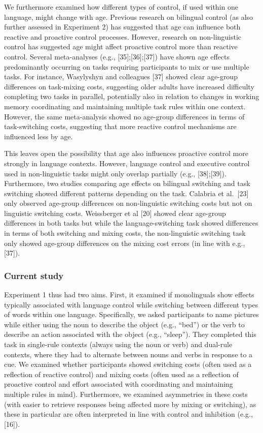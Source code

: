 \documentclass[
]{article}
\begin{document}
We furthermore examined how different types of control, if used within one language, might change with age. Previous research on bilingual control (as also further assessed in Experiment 2) has suggested that age can influence both reactive and proactive control processes. However, research on non-linguistic control has suggested age might affect proactive control more than reactive control. Several meta-analyses (e.g., {[}35{]};{[}36{]};{[}37{]}) have shown age effects predominantly occurring on tasks requiring participants to mix or use multiple tasks. For instance, Wasylyshyn and colleagues {[}37{]} showed clear age-group differences on task-mixing costs, suggesting older adults have increased difficulty completing two tasks in parallel, potentially also in relation to changes in working memory coordinating and maintaining multiple task rules within one context. However, the same meta-analysis showed no age-group differences in terms of task-switching costs, suggesting that more reactive control mechanisms are influenced less by age.

This leaves open the possibility that age also influences proactive control more strongly in language contexts. However, language control and executive control used in non-linguistic tasks might only overlap partially (e.g., {[}38{]};{[}39{]}). Furthermore, two studies comparing age effects on bilingual switching and task switching showed different patterns depending on the task. Calabria et al.~{[}23{]} only observed age-group differences on non-linguistic switching costs but not on linguistic switching costs. Weissberger et al {[}20{]} showed clear age-group differences in both tasks but while the language-switching task showed differences in terms of both switching and mixing costs, the non-linguistic switching task only showed age-group differences on the mixing cost errors (in line with e.g., {[}37{]}).

\hypertarget{current-study}{%
\subsubsection{Current study}\label{current-study}}

Experiment 1 thus had two aims. First, it examined if monolinguals show effects typically associated with language control while switching between different types of words within one language. Specifically, we asked participants to name pictures while either using the noun to describe the object (e.g., ``bed'') or the verb to describe an action associated with the object (e.g., ``sleep''). They completed this task in single-rule contexts (always using the noun or verb) and dual-rule contexts, where they had to alternate between nouns and verbs in response to a cue. We examined whether participants showed switching costs (often used as a reflection of reactive control) and mixing costs (often used as a reflection of proactive control and effort associated with coordinating and maintaining multiple rules in mind). Furthermore, we examined asymmetries in these costs (with easier to retrieve responses being affected more by mixing or switching), as these in particular are often interpreted in line with control and inhibition (e.g., {[}16{]}).
\end{document}
